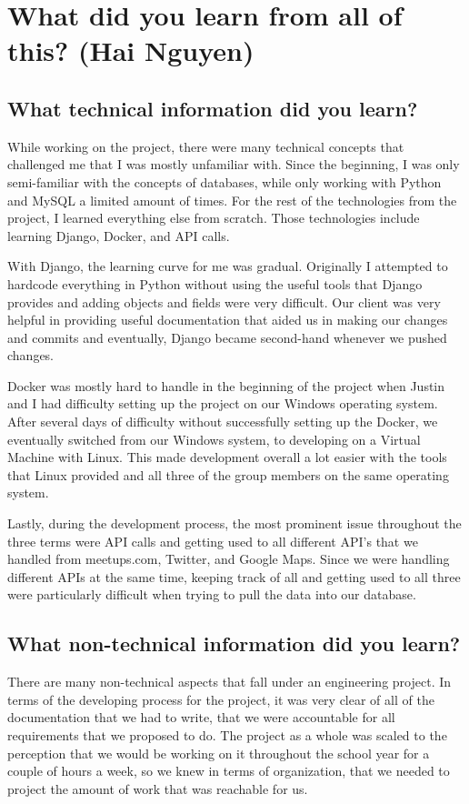 \documentclass[draftclsnofoot,10pt,onecolumn]{IEEEtran} %
\begin{document}
\section{What did you learn from all of this? (Hai Nguyen)}

\subsection{What technical information did you learn?}
While working on the project, there were many technical concepts that challenged
me that I was mostly unfamiliar with. Since the beginning, I was only
semi-familiar with the concepts of databases, while only working with Python and
MySQL a limited amount of times. For the rest of the technologies from the
project, I learned everything else from scratch. Those technologies include
learning Django, Docker, and API calls. 

With Django, the learning curve for me was gradual. Originally I attempted to
hardcode everything in Python without using the useful tools that Django
provides and adding objects and fields were very difficult. Our client was very
helpful in providing useful documentation that aided us in making our changes
and commits and eventually, Django became second-hand whenever we pushed
changes. 

Docker was mostly hard to handle in the beginning of the project when Justin and
I had difficulty setting up the project on our Windows operating system. After
several days of difficulty without successfully setting up the Docker, we
eventually switched from our Windows system, to developing on a Virtual Machine
with Linux. This made development overall a lot easier with the tools that Linux
provided and all three of the group members on the same operating system.

Lastly, during the development process, the most prominent issue throughout the
three terms were API calls and getting used to all different API’s that we
handled from meetups.com, Twitter, and Google Maps. Since we were handling
different APIs at the same time, keeping track of all and getting used to all
three were particularly difficult when trying to pull the data into our
database.

\subsection{What non-technical information did you learn?}
There are many non-technical aspects that fall under an engineering project. In
terms of the developing process for the project, it was very clear of all of the
documentation that we had to write, that we were accountable for all
requirements that we proposed to do. The project as a whole was scaled to the
perception that we would be working on it throughout the school year for a
couple of hours a week, so we knew in terms of organization, that we needed to
project the amount of work that was reachable for us. 
\end{document}
